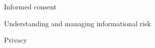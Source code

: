 \documentclass{beamer}
\begin{document}
\begin{frame}

Informed consent

\end{frame}
\begin{frame}

Understanding and managing informational risk

\end{frame}
\begin{frame}

\begin{center}
\end{center}

\end{frame}
\begin{frame}

Privacy

\end{frame}
\end{document}
